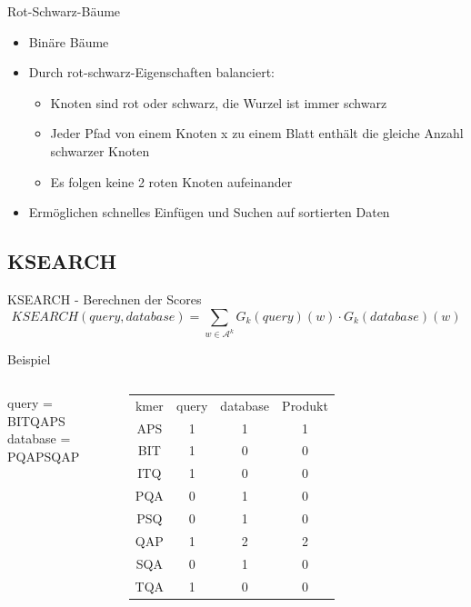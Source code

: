 \documentclass[xcolor=dvipsnames, aspectratio=1610]{beamer}
\begin{document}
\begin{frame}{Rot-Schwarz-Bäume}
  \begin{itemize}
    \item Binäre Bäume
    \item Durch rot-schwarz-Eigenschaften balanciert:
      \begin{itemize}
        \item Knoten sind rot oder schwarz, die Wurzel ist immer schwarz
        \item Jeder Pfad von einem Knoten x zu einem Blatt enthält die gleiche Anzahl schwarzer 
        Knoten
        \item Es folgen keine 2 roten Knoten aufeinander  
      \end{itemize}
    \item Ermöglichen schnelles Einfügen und Suchen auf sortierten Daten
  \end{itemize}
\end{frame}

\subsection{KSEARCH}

\begin{frame}{KSEARCH - Berechnen der Scores}
  \begin{equation*}
    KSEARCH(query,database) = \sum_{w \in \mathcal A^k} G_k(query)(w) \cdot G_k(database)(w)
  \end{equation*}  
  \begin{block}{Beispiel}
    \begin{columns}
    query = BITQAPS\\
    database = PQAPSQAP\\  
    \scriptsize\begin{tabular}{cccc}
    kmer & query & database & Produkt\\
    APS & 1 & 1 & 1\\
    BIT & 1 & 0 & 0\\
    ITQ & 1 & 0 & 0 \\
    PQA & 0 & 1 & 0\\
    PSQ & 0 & 1 & 0\\
    QAP & 1 & 2 & 2\\
    SQA & 0 & 1 & 0\\
    TQA & 1 & 0 & 0\\    
    \end{tabular}
    \normalsize
    \end{columns}
  \end{block}
\end{frame}
\end{document}
